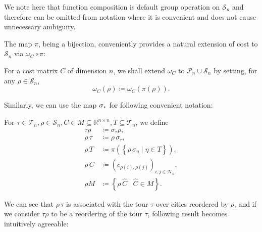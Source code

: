 \documentclass[titlepage,twoside,index=totoc,bibliography=totoc]{scrartcl}
\newcommand*{\Cdot}{\raisebox{-0.30ex}{\scalebox{1.5}{$\cdot$}}}
\numberwithin{equation}{section}
\numberwithin{figure}{section}
\numberwithin{table}{section}
\begin{document}
\begin{remark}
  We note here that function composition is default group operation on
  $\mathcal{S}_n$ and therefore can be omitted from notation where it is
  convenient and does not cause unnecessary ambiguity.
\end{remark}

The map $\pi$, being a bijection, conveniently provides a natural extension
of cost to $\mathcal{S}_n$ via $\omega_C \circ \pi$:
\begin{define}
  For a cost matrix $C$ of dimension $n$,
  we shall extend $\omega_C$ to $\mathcal{P}_n \cup \mathcal{S}_n$
  by setting, for any $\rho \in \mathcal{S}_n$,
  \[
    \omega_C\left(\rho\right) \coloneqq \omega_C\left(\pi\left(\rho\right)\right).
  \]
\end{define}

Similarly, we can use the map $\sigma_{\Cdot}$ for following convenient notation:
\begin{define}
\label{def:actions}
  For $\tau \in \mathcal{T}_n, \rho \in \mathcal{S}_n,
       C \in M \subseteq \mathbb{R}^{n \times n}, T \subseteq \mathcal{T}_n$,
  we define
  \begin{align*}
    \tau \rho & \coloneqq \sigma_\tau \rho, \\
    \rho \, \tau & \coloneqq \rho \, \sigma_\tau, \\
    \rho \, T & \coloneqq \pi\left(\left\{ \rho \, \sigma_\eta \mid \eta \in T \right\}\right), \\
    \rho \, C & \coloneqq \left(c_{\rho\left(i\right),\rho\left(j\right)}\right)_{i,j \in \mathcal{N}_n}, \\
    \rho M & \coloneqq \left\{ \rho \, \widehat{C} \mid \widehat{C} \in M \right\}.
  \end{align*}
\end{define}

We can see that $\rho \, \tau$ is associated with the tour $\tau$ over
cities reordered by $\rho$, and if we consider $\tau \rho$ to be a
reordering of the tour $\tau$, following result becomes intuitively
agreeable:
\end{document}
